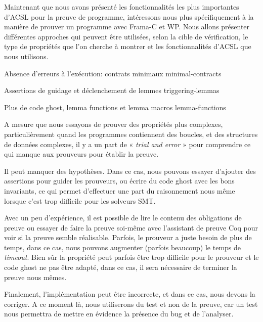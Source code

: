Maintenant que  nous avons présenté les fonctionnalités les plus importantes
d'ACSL pour la preuve de programme, intéressons nous plus spécifiquement à la
manière de prouver un programme avec Frama-C et WP. Nous allons présenter
différentes approches qui peuvent être utilisées, selon la cible de vérification,
le type de propriétés que l'on cherche à montrer et les fonctionnalités d'ACSL
que nous utilisons.


\begin{levelTwo}
  {Absence d'erreurs à l'exécution: contrats minimaux}
  {minimal-contracts}
\end{levelTwo}

\begin{levelTwo}
  {Assertions de guidage et déclenchement de lemmes}
  {triggering-lemmas}
\end{levelTwo}

\begin{levelTwo}
  {Plus de code ghost, lemma functions et lemma macros}
  {lemma-functions}
\end{levelTwo}



\horizontalLine
\newpage


A mesure que nous essayons de prouver des propriétés plus complexes,
particulièrement quand les programmes contiennent des boucles, et des
structures de données complexes, il y a un part de « \textit{trial and error} »
pour comprendre ce qui manque aux prouveurs pour établir la preuve.


Il peut manquer des hypothèses. Dans ce cas, nous pouvons essayer d'ajouter
des assertions pour guider les prouveurs, ou écrire du code ghost avec les
bons invariants, ce qui permet d'effectuer une part du raisonnement nous
même lorsque c'est trop difficile pour les solveurs SMT.


Avec un peu d'expérience, il est possible de lire le contenu des
obligations de preuve ou essayer de faire la preuve soi-même avec
l'assistant de preuve Coq pour voir si la preuve semble réalisable.
Parfois, le prouveur a juste besoin de plus de temps, dans ce cas, nous
pouvons augmenter (parfois beaucoup) le temps de \textit{timeout}. Bien
sûr la propriété peut parfois être trop difficile pour le prouveur et
le code ghost ne pas être adapté, dans ce cas, il sera nécessaire de
terminer la preuve nous mêmes.


Finalement, l'implémentation peut être incorrecte, et dans ce cas,
nous devons la corriger. A ce moment là, nous utiliserons du test et
non de la preuve, car un test nous permettra de mettre en évidence la
présence du bug et de l'analyser.
